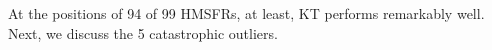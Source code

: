 At the positions of 94 of 99 HMSFRs, at least, KT performs remarkably well. 
Next, we discuss the 5 catastrophic outliers.




